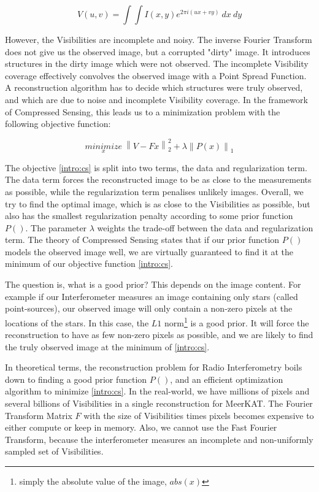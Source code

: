 \begin{equation}\label{intro:measurement}
V(u, v) = \int\int I(x, y) e^{2 \pi i (ux+vy)} \: dx \: dy
\end{equation}

However, the Visibilities are incomplete and noisy. The inverse Fourier Transform does not give us the observed image, but a corrupted "dirty" image.  It introduces structures in the dirty image which were not observed. The incomplete Visibility coverage effectively convolves the observed image with a Point Spread Function. A reconstruction algorithm has to decide which structures were truly observed, and which are due to noise and incomplete Visibility coverage. In the framework of Compressed Sensing, this leads us to a minimization problem with the following objective function:

\begin{equation}\label{intro:cs}
\underset{x}{minimize} \: \left \| V - Fx \right \|_2^2 + \lambda \left \| P(x) \right \|_1
\end{equation}

The objective \eqref{intro:cs} is split into two terms, the data and regularization term. The data term forces the reconstructed image to be as close to the measurements as possible, while the regularization term penalises unlikely images. Overall, we try to find the optimal image, which is as close to the Visibilities as possible, but also has the smallest regularization penalty according to some prior function $P()$. The parameter $\lambda$ weights the trade-off between the data and regularization term. The theory of Compressed Sensing states that if our prior function $P()$ models the observed image well, we are virtually guaranteed to find it at the minimum of our objective function \eqref{intro:cs}.

The question is, what is a good prior? This depends on the image content. For example if our Interferometer measures an image containing only stars (called point-sources), our observed image will only contain a non-zero pixels at the locations of the stars. In this case, the $L1$ norm\footnote{simply the absolute value of the image, $abs(x)$} is a good prior. It will force the reconstruction to have as few non-zero pixels as possible, and we are likely to find the truly observed image at the minimum of \eqref{intro:cs}.

In theoretical terms, the reconstruction problem for Radio Interferometry boils down to finding a good prior function $P()$, and an efficient optimization algorithm to minimize \eqref{intro:cs}. In the real-world, we have millions of pixels and several billions of Visibilities in a single reconstruction for MeerKAT. The Fourier Transform Matrix $F$ with the size of Visibilities times pixels becomes expensive to either compute or keep in memory. Also, we cannot use the Fast Fourier Transform, because the interferometer measures an incomplete and non-uniformly sampled set of Visibilities.

